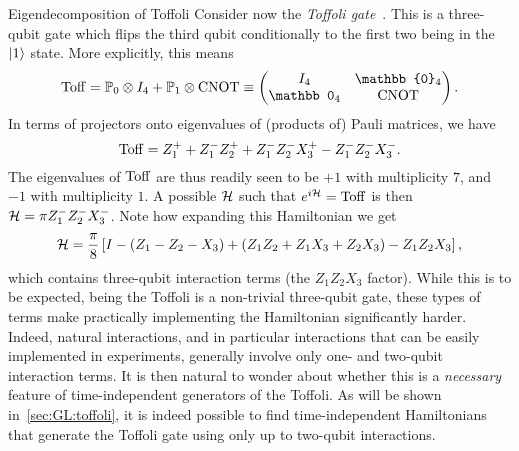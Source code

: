 \begin{examplebox}[label={ex:GL:eigendecomposition_Toffoli}]{Eigendecomposition of Toffoli}
Consider now the \emph{Toffoli gate}~\cite{shi2002both,lanyon2008simplifying,monz2009realization,fedorov2011implementation,shi2018deutsch}. This is a three-qubit gate which flips the third qubit conditionally to the first two being in the $\ket1$ state.
More explicitly, this means
\begin{equation}
    \Toff =
    \PP_0\otimes I_4 + \PP_1\otimes\CNOT
    \equiv
    \begin{pmatrix}
        I_4 & \mathbb{0}_4 \\
        \mathbb 0_4 & \CNOT
    \end{pmatrix}.
\end{equation}
In terms of projectors onto eigenvalues of (products of) Pauli matrices, we have
\begin{equation}
    \operatorname{Toff} = Z_1^+ + Z_1^- Z_2^+ + Z_1^- Z_2^- X_3^+ - Z_1^- Z_2^- X_3^-.
\end{equation}
The eigenvalues of $\operatorname{Toff}$ are thus readily seen to be $+1$ with multiplicity $7$, and $-1$ with multiplicity $1$.
A possible ${\mathcal{H}}$ such that $e^{i{\mathcal{H}}}=\operatorname{Toff}$ is then ${\mathcal{H}}=\pi Z_1^- Z_2^- X_3^-$.
Note how expanding this Hamiltonian we get
\begin{equation}
    {\mathcal{H}} = \frac{\pi}{8}\left[
        I - (Z_1 - Z_2 - X_3)
        + (Z_1 Z_2 + Z_1 X_3 + Z_2 X_3)
        - Z_1 Z_2 X_3
    \right],
\end{equation}
which contains three-qubit interaction terms (the $Z_1 Z_2 X_3$ factor). While this is to be expected, being the Toffoli is a non-trivial three-qubit gate, these types of terms make practically implementing the Hamiltonian significantly harder.
Indeed, natural interactions, and in particular interactions that can be easily implemented in experiments, generally involve only one- and two-qubit interaction terms.
It is then natural to wonder about whether this is a \emph{necessary} feature of time-independent generators of the Toffoli.
As will be shown in~\cref{sec:GL:toffoli}, it is indeed possible to find time-independent Hamiltonians that generate the Toffoli gate using only up to two-qubit interactions.
\end{examplebox}

